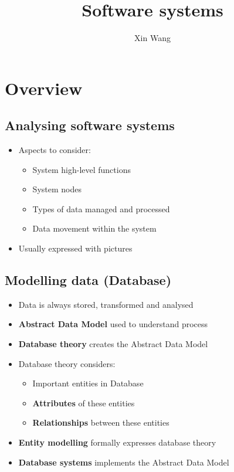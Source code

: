 \documentclass[conference]{IEEEtran}
\begin{document}
\title{Software systems}
\author{Xin Wang}
\maketitle
\section{\textbf{Overview}}
\subsection{Analysing software systems}

\begin{itemize}
    \item Aspects to consider:
    \begin{itemize}
        \item System high-level functions
        \item System nodes
        \item Types of data managed and processed
        \item Data movement within the system
    \end{itemize}

    \item Usually expressed with pictures
\end{itemize}

\subsection{Modelling data (Database)}

\begin{itemize}
    \item Data is always stored, transformed and analysed
    \item \textbf{Abstract Data Model} used to understand process
    \item \textbf{Database theory} creates the Abstract Data Model
    \item Database theory considers:
    \begin{itemize}
        \item Important entities in Database
        \item \textbf{Attributes} of these entities
        \item \textbf{Relationships} between these entities
    \end{itemize}
    \item \textbf{Entity modelling} formally expresses database theory
    \item \textbf{Database systems} implements the Abstract Data Model
\end{itemize}
\end{document}

